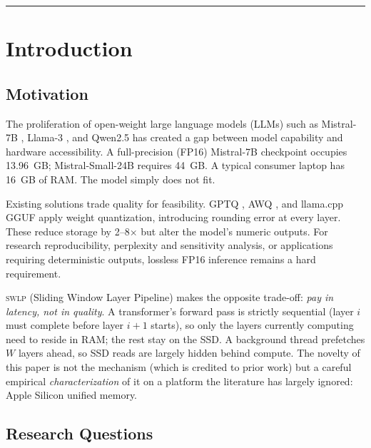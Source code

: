 \documentclass[10pt,a4paper]{article}
\newcommand{\swlp}{\textsc{swlp}}
\begin{document}
\vspace{1em}
\hrule
\vspace{1em}


\section{Introduction}
\label{sec:intro}

\subsection{Motivation}
\label{subsec:motivation}

The proliferation of open-weight large language models (LLMs) such as Mistral-7B
\cite{jiang2023mistral}, Llama-3 \cite{llama32024}, and Qwen2.5 \cite{qwen2024}
has created a gap between model capability and hardware accessibility. A
full-precision (FP16) Mistral-7B checkpoint occupies 13.96~GB; Mistral-Small-24B
requires 44~GB. A typical consumer laptop has 16~GB of RAM. The model simply does
not fit.

Existing solutions trade quality for feasibility. GPTQ \cite{frantar2023gptq},
AWQ \cite{lin2023awq}, and llama.cpp GGUF \cite{gerganov2023llama} apply weight
quantization, introducing rounding error at every layer. These reduce storage by
2--8$\times$ but alter the model's numeric outputs. For research reproducibility,
perplexity and sensitivity analysis, or applications requiring deterministic
outputs, lossless FP16 inference remains a hard requirement.

\swlp{} (Sliding Window Layer Pipeline) makes the opposite trade-off: \emph{pay
in latency, not in quality}. A transformer's forward pass is strictly sequential
(layer $i$ must complete before layer $i+1$ starts), so only the layers
currently computing need to reside in RAM; the rest stay on the SSD. A background
thread prefetches $W$ layers ahead, so SSD reads are largely hidden behind
compute. The novelty of this paper is not the mechanism (which is credited to
prior work) but a careful empirical \emph{characterization} of it on a platform
the literature has largely ignored: Apple Silicon unified memory.

\subsection{Research Questions}
\label{subsec:rq}
\end{document}
